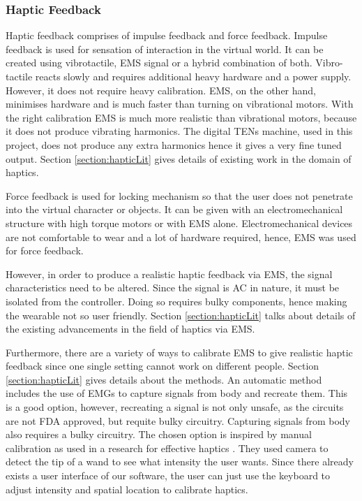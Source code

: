 \subsubsection{Haptic Feedback}

Haptic feedback comprises of impulse feedback and force feedback. Impulse feedback is used for sensation of interaction in the virtual world. It can be created using vibrotactile, EMS signal or a hybrid combination of both. Vibro-tactile reacts slowly and requires additional heavy hardware and a power supply. However, it does not require heavy calibration. EMS, on the other hand, minimises hardware and is much faster than turning on vibrational motors. With the right calibration EMS is much more realistic than vibrational motors, because it does not produce vibrating harmonics. The digital TENs machine, used in this project, does not produce any extra harmonics hence it gives a very fine tuned output. Section \ref{section:hapticLit} gives details of existing work in the domain of haptics. 

Force feedback is used for locking mechanism so that the user does not penetrate into the virtual character or objects. It can be given with an electromechanical structure with high torque motors or with EMS alone. Electromechanical devices are not comfortable to wear and a lot of hardware required, hence, EMS was used for force feedback.

However, in order to produce a realistic haptic feedback via EMS, the signal characteristics need to be altered. Since the signal is AC in nature, it must be isolated from the controller. Doing so requires bulky components, hence making the wearable not so user friendly. Section \ref{section:hapticLit} talks about details of the existing advancements in the field of haptics via EMS.

Furthermore, there are a variety of ways to calibrate EMS to give realistic haptic feedback since one single setting cannot work on different people. Section \ref{section:hapticLit} gives details about the methods. An automatic method includes the use of EMGs to capture signals from body and recreate them. This is a good option, however, recreating a signal is not only unsafe, as the circuits are not FDA approved, but requite bulky circuitry. Capturing signals from body also requires a bulky circuitry. The chosen option is inspired by manual calibration as used in a research for effective haptics \cite{affHaptics}. They used camera to detect the tip of a wand to see what intensity the user wants. Since there already exists a user interface of our software, the user can just use the keyboard to adjust intensity and spatial location to calibrate haptics. 

